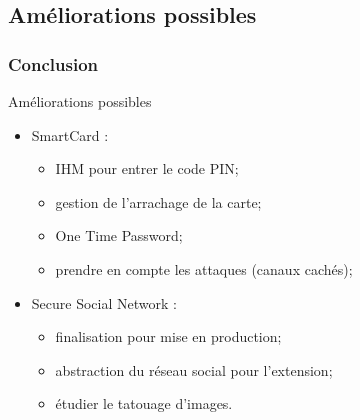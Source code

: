 \documentclass{beamer}
\begin{document}
\subsection{Améliorations possibles}

\begin{frame}
    \frametitle{Conclusion}
    \begin{block}{Améliorations possibles}
        \begin{itemize}
            \item SmartCard : 
                \begin{itemize}
                    \item IHM pour entrer le code PIN; %
                    \item gestion de l'arrachage de la carte; %
                    \item One Time Password;
                    \item prendre en compte les attaques (canaux cachés);
                \end{itemize}
            \item Secure Social Network : 
                \begin{itemize}
                    \item finalisation pour mise en production;
                    \item abstraction du réseau social pour l'extension;
                    \item étudier le tatouage d'images.
                \end{itemize}
        \end{itemize}
    \end{block}
\end{frame}
\end{document}
